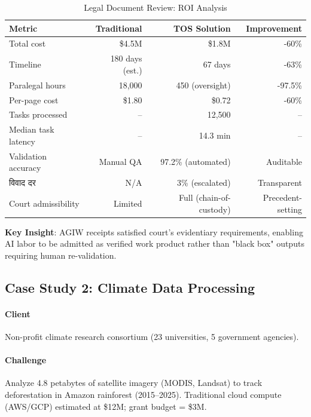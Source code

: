 \documentclass[11pt]{article}
\begin{document}
\begin{itemize}[noitemsep]
\begin{itemize}[noitemsep]
\begin{itemize}[noitemsep]
\begin{itemize}[noitemsep]
\begin{itemize}[noitemsep]
\begin{itemize}[noitemsep]
\begin{table}[H]
\centering
\caption{Legal Document Review: ROI Analysis}
\label{tab:legal-roi}
\begin{tabular}{@{}lrrr@{}}
\toprule
\textbf{Metric} & \textbf{Traditional} & \textbf{TOS Solution} & \textbf{Improvement} \\ \midrule
Total cost & \$4.5M & \$1.8M & -60\% \\
Timeline & 180 days (est.) & 67 days & -63\% \\
Paralegal hours & 18,000 & 450 (oversight) & -97.5\% \\
Per-page cost & \$1.80 & \$0.72 & -60\% \\
Tasks processed & -- & 12,500 & -- \\
Median task latency & -- & 14.3 min & -- \\
Validation accuracy & Manual QA & 97.2\% (automated) & Auditable \\
विवाद दर & N/A & 3\% (escalated) & Transparent \\
Court admissibility & Limited & Full (chain-of-custody) & Precedent-setting \\
\bottomrule
\end{tabular}
\end{table}

\textbf{Key Insight}: AGIW receipts satisfied court's evidentiary requirements, enabling AI labor to be admitted as verified work product rather than "black box" outputs requiring human re-validation.

\subsection{Case Study 2: Climate Data Processing}

\paragraph{Client} Non-profit climate research consortium (23 universities, 5 government agencies).

\paragraph{Challenge} Analyze 4.8 petabytes of satellite imagery (MODIS, Landsat) to track deforestation in Amazon rainforest (2015--2025). Traditional cloud compute (AWS/GCP) estimated at \$12M; grant budget = \$3M.


\end{itemize}
\end{itemize}
\end{itemize}
\end{itemize}
\end{itemize}
\end{itemize}
\end{document}
